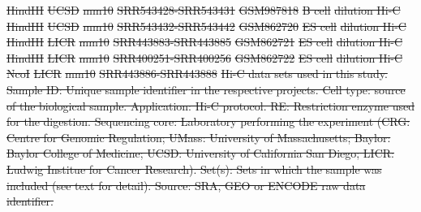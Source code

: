 \documentclass[a4,center,fleqn]{NAR}
\providecommand{\DIFdel}[1]{{\protect\color{red}\sout{#1}}}                      %
\providecommand{\DIFdelFL}[1]{\DIFdel{#1}} %
\begin{document}
\DIFdelFL{HindIII }%
\DIFdelFL{UCSD }%
\DIFdelFL{mm10 }%
\DIFdelFL{SRR543428-SRR543431 }%
\DIFdelFL{GSM987818 }%
\DIFdelFL{B cell  }%
\DIFdelFL{dilution Hi-C }%
\DIFdelFL{HindIII }%
\DIFdelFL{UCSD }%
\DIFdelFL{mm10 }%
\DIFdelFL{SRR543432-SRR543442 }%
\DIFdelFL{GSM862720 }%
\DIFdelFL{ES cell }%
\DIFdelFL{dilution Hi-C }%
\DIFdelFL{HindIII }%
\DIFdelFL{LICR }%
\DIFdelFL{mm10 }%
\DIFdelFL{SRR443883-SRR443885 }%
\DIFdelFL{GSM862721 }%
\DIFdelFL{ES cell }%
\DIFdelFL{dilution Hi-C }%
\DIFdelFL{HindIII }%
\DIFdelFL{LICR }%
\DIFdelFL{mm10 }%
\DIFdelFL{SRR400251-SRR400256 }%
\DIFdelFL{GSM862722 }%
\DIFdelFL{ES cell }%
\DIFdelFL{dilution Hi-C }%
\DIFdelFL{NcoI    }%
\DIFdelFL{LICR }%
\DIFdelFL{mm10 }%
\DIFdelFL{SRR443886-SRR443888 }%
{%
\DIFdelFL{Hi-C data sets used in this study. Sample ID: Unique sample
identifier in the respective projects. Cell type: source of the biological
sample. Application: Hi-C protocol. RE: Restriction enzyme used for the
digestion. Sequencing core: Laboratory performing the experiment (CRG:
Centre for Genomic Regulation; UMass: University of Massachusetts; Baylor:
Baylor College of Medicine; UCSD: University of California San Diego;
LICR: Ludwig Institue for Cancer Research). Set(s): Sets in which the
sample was included (see text for detail).  Source: SRA, GEO or ENCODE raw
data identifier.}}

\end{document}
